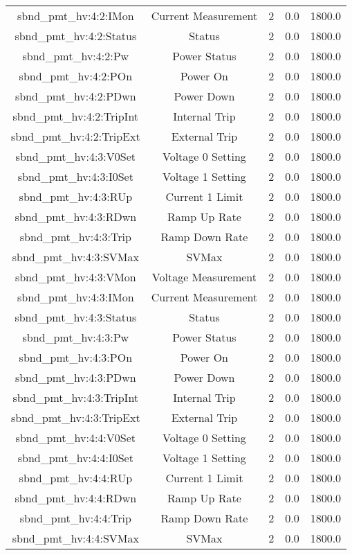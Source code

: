 \begin{table}[ptb]
\begin{tabular}{c | c c c c}
sbnd_pmt_hv:4:2:IMon & Current Measurement & 2 & 0.0 & 1800.0\\ 
sbnd_pmt_hv:4:2:Status & Status & 2 & 0.0 & 1800.0\\ 
sbnd_pmt_hv:4:2:Pw & Power Status & 2 & 0.0 & 1800.0\\ 
sbnd_pmt_hv:4:2:POn & Power On & 2 & 0.0 & 1800.0\\ 
sbnd_pmt_hv:4:2:PDwn & Power Down & 2 & 0.0 & 1800.0\\ 
sbnd_pmt_hv:4:2:TripInt & Internal Trip & 2 & 0.0 & 1800.0\\ 
sbnd_pmt_hv:4:2:TripExt & External Trip & 2 & 0.0 & 1800.0\\ 
sbnd_pmt_hv:4:3:V0Set & Voltage 0 Setting & 2 & 0.0 & 1800.0\\ 
sbnd_pmt_hv:4:3:I0Set & Voltage 1 Setting & 2 & 0.0 & 1800.0\\ 
sbnd_pmt_hv:4:3:RUp & Current 1 Limit & 2 & 0.0 & 1800.0\\ 
sbnd_pmt_hv:4:3:RDwn & Ramp Up Rate & 2 & 0.0 & 1800.0\\ 
sbnd_pmt_hv:4:3:Trip & Ramp Down Rate & 2 & 0.0 & 1800.0\\ 
sbnd_pmt_hv:4:3:SVMax & SVMax & 2 & 0.0 & 1800.0\\ 
sbnd_pmt_hv:4:3:VMon & Voltage Measurement & 2 & 0.0 & 1800.0\\ 
sbnd_pmt_hv:4:3:IMon & Current Measurement & 2 & 0.0 & 1800.0\\ 
sbnd_pmt_hv:4:3:Status & Status & 2 & 0.0 & 1800.0\\ 
sbnd_pmt_hv:4:3:Pw & Power Status & 2 & 0.0 & 1800.0\\ 
sbnd_pmt_hv:4:3:POn & Power On & 2 & 0.0 & 1800.0\\ 
sbnd_pmt_hv:4:3:PDwn & Power Down & 2 & 0.0 & 1800.0\\ 
sbnd_pmt_hv:4:3:TripInt & Internal Trip & 2 & 0.0 & 1800.0\\ 
sbnd_pmt_hv:4:3:TripExt & External Trip & 2 & 0.0 & 1800.0\\ 
sbnd_pmt_hv:4:4:V0Set & Voltage 0 Setting & 2 & 0.0 & 1800.0\\ 
sbnd_pmt_hv:4:4:I0Set & Voltage 1 Setting & 2 & 0.0 & 1800.0\\ 
sbnd_pmt_hv:4:4:RUp & Current 1 Limit & 2 & 0.0 & 1800.0\\ 
sbnd_pmt_hv:4:4:RDwn & Ramp Up Rate & 2 & 0.0 & 1800.0\\ 
sbnd_pmt_hv:4:4:Trip & Ramp Down Rate & 2 & 0.0 & 1800.0\\ 
sbnd_pmt_hv:4:4:SVMax & SVMax & 2 & 0.0 & 1800.0\\ 

\end{tabular}
\end{table}
